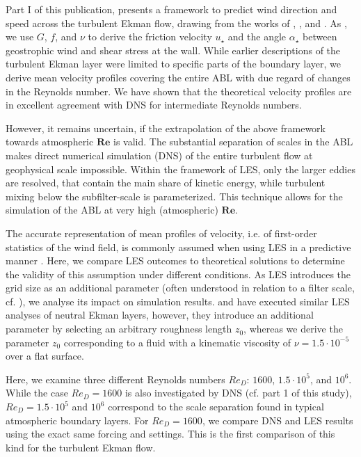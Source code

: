 \documentclass[smallcondensed,final]{svjour3}
\newcommand{\RE}{\mathbf{Re}}
\begin{document}
Part I of this publication, presents a framework to predict wind direction and speed across the turbulent Ekman flow, drawing from the works of \cite{csanady1967resistance}, \cite{tennekes1973logarithmic}, and \cite{spalart1989theoretical}. As \cite{spalart1989theoretical}, we use $G$, $f$, and $\nu$ to derive the friction velocity $u_\star$ and the angle $\alpha_\star$ between geostrophic wind and shear stress at the wall. While earlier descriptions of the turbulent Ekman layer were limited to specific parts of the boundary layer, we derive mean velocity profiles covering the entire ABL with due regard of changes in the Reynolds number. We have shown that the theoretical velocity profiles are in excellent agreement with DNS for intermediate Reynolds numbers. 

However, it remains uncertain, if the extrapolation of the above framework towards atmospheric $\RE$ is valid. The substantial separation of scales in the ABL makes direct numerical simulation (DNS) of the entire turbulent flow at geophysical scale impossible. Within the framework of LES, only the larger eddies are resolved, that contain the main share of kinetic energy, while turbulent mixing below the subfilter-scale is parameterized. This technique allows for the simulation of the ABL at very high (atmospheric) $\RE$. 

The accurate representation of mean profiles of velocity, i.e. of first-order statistics of the wind field, is commonly assumed when using LES in a predictive manner  \citep{fedorovich2004convective}. Here, we compare LES outcomes to theoretical solutions to determine the validity of this assumption under different conditions. As LES introduces the grid size as an additional parameter (often understood in relation to a filter scale, cf. \cite{pope2004ten}), we analyse its impact on simulation results. \cite{esau2004simulation} and \cite{jiang2018large} have executed similar LES analyses of neutral Ekman layers, however, they introduce an additional parameter by selecting an arbitrary roughness length $z_0$, whereas we derive the parameter $z_0$ corresponding to a fluid with a kinematic viscosity of $\nu = 1.5\cdot10^{-5}$ over a flat surface.

Here, we examine three different Reynolds numbers $Re_D$: $1600$, $1.5\cdot10^5$, and $10^6$. While the case $Re_D=1600$ is also investigated by DNS (cf. part 1 of this study), $Re_D=1.5 \cdot 10^5$ and $10^6$ correspond to the scale separation found in typical atmospheric boundary layers. For $Re_D=1600$, we compare DNS \citep{ansorge:2024b} and LES results using the exact same forcing and settings. This is the first comparison of this kind for the turbulent Ekman flow. 
\end{document}
